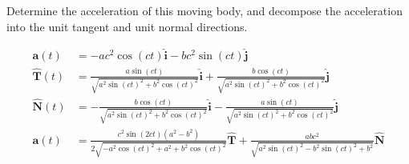 Determine the acceleration of this moving body, and decompose the acceleration into the unit tangent and unit normal directions.

\begin{solution}
\begin{align*}
    \boldsymbol{a}(t) &= -ac^2\cos(ct) \hat{\boldsymbol{i}} - bc^2\sin(ct) \hat{\boldsymbol{j}} \\
    \boldsymbol{\hat{T}}(t) &= \frac{a\sin(ct)}{\sqrt{a^2\sin(ct)^2+b^2\cos(ct)^2}} \hat{\boldsymbol{i}} + \frac{b\cos(ct)}{\sqrt{a^2\sin(ct)^2+b^2\cos(ct)^2}} \hat{\boldsymbol{j}} \\
    \boldsymbol{\hat{N}}(t) &= -\frac{b\cos(ct)}{\sqrt{a^2\sin(ct)^2+b^2\cos(ct)^2}} \hat{\boldsymbol{i}} - \frac{a\sin(ct)}{\sqrt{a^2\sin(ct)^2+b^2\cos(ct)^2}} \hat{\boldsymbol{j}} \\
    \boldsymbol{a}(t) &= \frac{c^{2} \sin (2 c t)\left(a^{2}-b^{2}\right)}{2 \sqrt{-a^{2} \cos (c t)^{2}+a^{2}+b^{2} \cos (c t)^{2}}} \boldsymbol{\hat{T}} + \frac{a b c^{2}}{\sqrt{a^{2} \sin (c t)^{2}-b^{2} \sin (c t)^{2}+b^{2}}} \boldsymbol{\hat{N}}
\end{align*}
\end{solution}